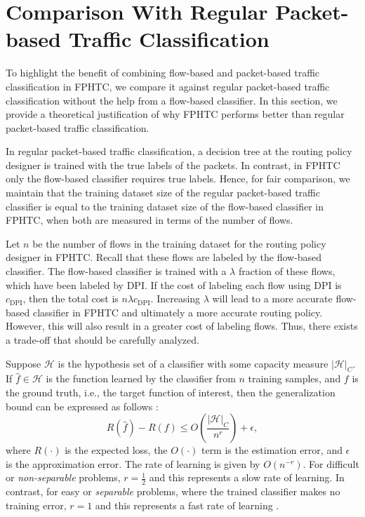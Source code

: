 
\section{Comparison With Regular Packet-based Traffic Classification}
\label{sec:policy}

To highlight the benefit of combining flow-based and packet-based traffic classification in FPHTC, we compare it against regular packet-based traffic classification without the help from a flow-based classifier. In this section, we provide a theoretical justification of why FPHTC performs better than regular packet-based traffic classification.

In regular packet-based traffic classification, a decision tree at the routing policy designer is trained with the true labels of the packets. In contrast, in FPHTC only the flow-based classifier requires true labels.  Hence, for fair comparison, we maintain that the training dataset size of the regular packet-based traffic classifier is equal to the training dataset size of the flow-based classifier in FPHTC, when both are measured in terms of the number of flows.

Let $n$ be the number of flows in the training dataset for the routing policy designer in FPHTC. Recall that these flows are labeled by the flow-based classifier. The flow-based classifier is trained with a $\lambda$ fraction of these flows, which have been labeled by DPI. If the cost of labeling each flow using DPI is $c_\text{DPI}$, then the total cost is $n\lambda c_\text{DPI}$. Increasing $\lambda$ will lead to a more accurate flow-based classifier in FPHTC and ultimately a more accurate routing policy. However, this will also result in a greater cost of labeling flows. Thus, there exists a trade-off that should be carefully analyzed.

Suppose $\mathcal{H}$ is the hypothesis set of a classifier with some capacity measure $|\mathcal{H}|_C$. If $\hat{f}\in\mathcal{H}$ is the function learned by the classifier from $n$ training samples, and $f$ is the ground truth, i.e., the target function of interest, then the generalization bound can be expressed as follows \cite{Vapnik16}:
\begin{equation}
R(\hat{f})-R(f)\leq O\left(\frac{|\mathcal{H}|_C}{n^r}\right) + \epsilon,
\label{eq:g}
\end{equation}
where $R(\cdot)$ is the expected loss, the $O(\cdot)$ term is the estimation error, and $\epsilon$ is the approximation error. The rate of learning is given by $O(n^{-r})$. For difficult or \textit{non-separable} problems, $r=\frac{1}{2}$ and this represents a slow rate of learning. In contrast, for easy or \textit{separable} problems, where the trained classifier makes no training error, $r=1$ and this represents a fast rate of learning \cite{Vapnik16}.

